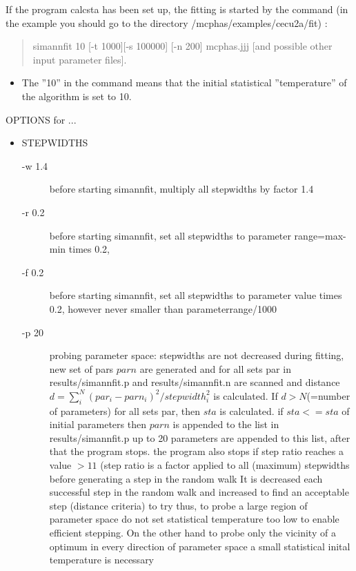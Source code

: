 If the program {\prg calcsta} has been set up, the fitting is started
by the command (in the example you should go to the directory {\prg /mcphas/examples/cecu2a/fit}) 
:

\begin{quote}
 {\prg simannfit 10 [-t 1000][-s 100000] [-n 200] mcphas.jjj [and possible other input parameter files]}.
\end{quote}

\begin{itemize}
\item
The ''10'' in the command means that the initial statistical
''temperature'' of the algorithm
is set to 10.  
\end{itemize}

 OPTIONS for ...
\begin{itemize}
\item STEPWIDTHS
\begin{description}
\item[-w 1.4]  before starting simannfit, multiply all stepwidths by factor 1.4 
\item[-r 0.2] before starting simannfit, set all stepwidths to parameter 
            range=max-min times 0.2, 
\item[-f 0.2] before starting simannfit, set all stepwidths to parameter value 
            times 0.2, however never smaller than parameterrange/1000 
\item[-p 20] probing parameter space: stepwidths are not decreased during
	    fitting, new set of pars $parn$ are generated and for all sets par in 
	    {\prg results/simannfit.p} and {\prg results/simannfit.n} are scanned and
	    distance $d=\sum_i^N (par_i-parn_i)^2/stepwidth_i^2$ is calculated. If
$d>N $(=number of parameters)
	    for all sets par, then $sta$ is calculated. if  $sta<=sta$ of initial parameters
	    then $parn$ is appended to the list in {\prg results/simannfit.p}
	    up to 20 parameters are appended to this list, after that the program stops.
	    the program also stops if step ratio reaches a value $> 11$ (step ratio 
	    is a factor applied to all (maximum) stepwidths before generating a step in the random walk
	    It is decreased each successful step in the random walk and increased to find an
	    acceptable step (distance criteria) to try
	    thus, to probe a large region of parameter space do not set statistical
	    temperature too low to enable efficient stepping. On the other hand to
	    probe only the vicinity of a optimum in every direction of parameter
	    space a small statistical inital temperature is necessary

\end{description}
\end{itemize}
